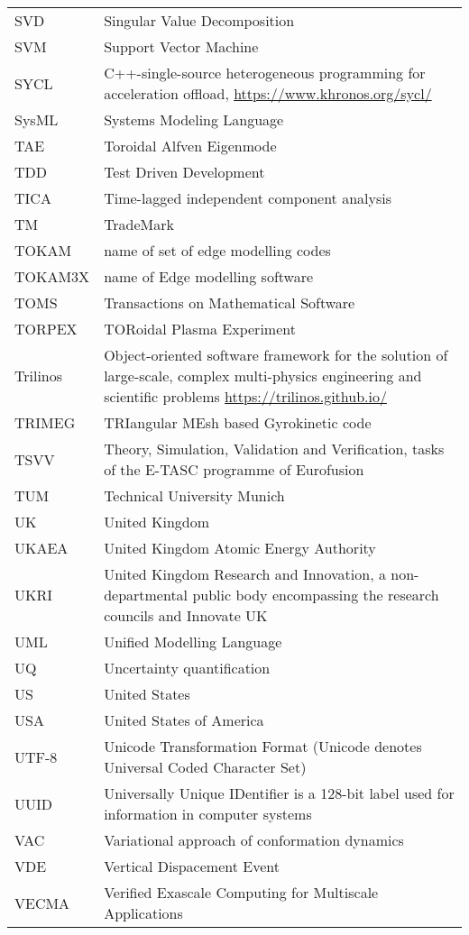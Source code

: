 \begin{longtable}{|p{4.0cm}|p{12.0cm}|}
SVD & Singular Value Decomposition \\
SVM & Support Vector Machine \\
SYCL & C++-single-source heterogeneous programming for acceleration offload, \url{https://www.khronos.org/sycl/} \\
SysML & Systems Modeling Language  \\
TAE & Toroidal Alfven Eigenmode \\
TDD & Test Driven Development \\
TICA  & Time-lagged independent component analysis \\
TM & TradeMark\\
TOKAM & name of set of edge modelling codes\\
TOKAM3X & name of Edge modelling software \\
TOMS & Transactions on Mathematical Software \\
TORPEX & TORoidal Plasma Experiment \\
Trilinos & Object-oriented software framework for the solution of large-scale, complex multi-physics engineering and scientific problems \url{https://trilinos.github.io/}\\
TRIMEG & TRIangular MEsh based Gyrokinetic code\\
TSVV & Theory, Simulation, Validation and Verification, tasks of the E-TASC programme of Eurofusion \\
TUM & Technical University Munich\\
UK & United Kingdom \\
UKAEA & United Kingdom Atomic Energy Authority \\
UKRI & United Kingdom Research and Innovation, a non-departmental public body encompassing the research councils and Innovate UK \\
UML & Unified Modelling Language\\
UQ & Uncertainty quantification \\
US & United States \\
USA & United States of America\\
UTF-8 & Unicode Transformation Format (Unicode denotes Universal Coded Character Set) \\
UUID & Universally Unique IDentifier is a 128-bit label used for information in computer systems\\
VAC  & Variational approach of conformation dynamics \\
VDE & Vertical Dispacement Event\\
VECMA & Verified Exascale Computing for Multiscale Applications \\

\end{longtable}
